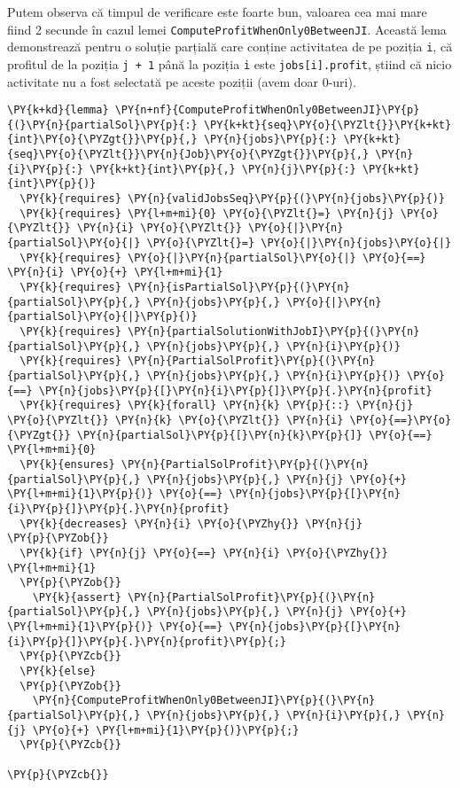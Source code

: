 Putem observa că timpul de verificare este foarte bun, valoarea cea mai mare  fiind 2 secunde în cazul lemei \texttt{ComputeProfitWhenOnly0BetweenJI}.
Această lema demonstrează pentru o soluție parțială care conține activitatea de pe poziția \texttt{i}, că profitul de la poziția \texttt{j + 1} până la poziția \texttt{i} este \texttt{jobs[i].profit}, știind că nicio activitate nu a fost selectată pe aceste poziții (avem doar 0-uri).

\begin{Verbatim}[commandchars=\\\{\}, fontsize=\footnotesize]
\PY{k+kd}{lemma} \PY{n+nf}{ComputeProfitWhenOnly0BetweenJI}\PY{p}{(}\PY{n}{partialSol}\PY{p}{:} \PY{k+kt}{seq}\PY{o}{\PYZlt{}}\PY{k+kt}{int}\PY{o}{\PYZgt{}}\PY{p}{,} \PY{n}{jobs}\PY{p}{:} \PY{k+kt}{seq}\PY{o}{\PYZlt{}}\PY{n}{Job}\PY{o}{\PYZgt{}}\PY{p}{,} \PY{n}{i}\PY{p}{:} \PY{k+kt}{int}\PY{p}{,} \PY{n}{j}\PY{p}{:} \PY{k+kt}{int}\PY{p}{)}
  \PY{k}{requires} \PY{n}{validJobsSeq}\PY{p}{(}\PY{n}{jobs}\PY{p}{)}
  \PY{k}{requires} \PY{l+m+mi}{0} \PY{o}{\PYZlt{}=} \PY{n}{j} \PY{o}{\PYZlt{}} \PY{n}{i} \PY{o}{\PYZlt{}} \PY{o}{|}\PY{n}{partialSol}\PY{o}{|} \PY{o}{\PYZlt{}=} \PY{o}{|}\PY{n}{jobs}\PY{o}{|}
  \PY{k}{requires} \PY{o}{|}\PY{n}{partialSol}\PY{o}{|} \PY{o}{==} \PY{n}{i} \PY{o}{+} \PY{l+m+mi}{1}
  \PY{k}{requires} \PY{n}{isPartialSol}\PY{p}{(}\PY{n}{partialSol}\PY{p}{,} \PY{n}{jobs}\PY{p}{,} \PY{o}{|}\PY{n}{partialSol}\PY{o}{|}\PY{p}{)}
  \PY{k}{requires} \PY{n}{partialSolutionWithJobI}\PY{p}{(}\PY{n}{partialSol}\PY{p}{,} \PY{n}{jobs}\PY{p}{,} \PY{n}{i}\PY{p}{)}
  \PY{k}{requires} \PY{n}{PartialSolProfit}\PY{p}{(}\PY{n}{partialSol}\PY{p}{,} \PY{n}{jobs}\PY{p}{,} \PY{n}{i}\PY{p}{)} \PY{o}{==} \PY{n}{jobs}\PY{p}{[}\PY{n}{i}\PY{p}{]}\PY{p}{.}\PY{n}{profit}
  \PY{k}{requires} \PY{k}{forall} \PY{n}{k} \PY{p}{::} \PY{n}{j} \PY{o}{\PYZlt{}} \PY{n}{k} \PY{o}{\PYZlt{}} \PY{n}{i} \PY{o}{==}\PY{o}{\PYZgt{}} \PY{n}{partialSol}\PY{p}{[}\PY{n}{k}\PY{p}{]} \PY{o}{==} \PY{l+m+mi}{0}
  \PY{k}{ensures} \PY{n}{PartialSolProfit}\PY{p}{(}\PY{n}{partialSol}\PY{p}{,} \PY{n}{jobs}\PY{p}{,} \PY{n}{j} \PY{o}{+} \PY{l+m+mi}{1}\PY{p}{)} \PY{o}{==} \PY{n}{jobs}\PY{p}{[}\PY{n}{i}\PY{p}{]}\PY{p}{.}\PY{n}{profit}
  \PY{k}{decreases} \PY{n}{i} \PY{o}{\PYZhy{}} \PY{n}{j}
\PY{p}{\PYZob{}}
  \PY{k}{if} \PY{n}{j} \PY{o}{==} \PY{n}{i} \PY{o}{\PYZhy{}} \PY{l+m+mi}{1}
  \PY{p}{\PYZob{}}
    \PY{k}{assert} \PY{n}{PartialSolProfit}\PY{p}{(}\PY{n}{partialSol}\PY{p}{,} \PY{n}{jobs}\PY{p}{,} \PY{n}{j} \PY{o}{+} \PY{l+m+mi}{1}\PY{p}{)} \PY{o}{==} \PY{n}{jobs}\PY{p}{[}\PY{n}{i}\PY{p}{]}\PY{p}{.}\PY{n}{profit}\PY{p}{;}
  \PY{p}{\PYZcb{}}
  \PY{k}{else}
  \PY{p}{\PYZob{}}
    \PY{n}{ComputeProfitWhenOnly0BetweenJI}\PY{p}{(}\PY{n}{partialSol}\PY{p}{,} \PY{n}{jobs}\PY{p}{,} \PY{n}{i}\PY{p}{,} \PY{n}{j} \PY{o}{+} \PY{l+m+mi}{1}\PY{p}{)}\PY{p}{;}
  \PY{p}{\PYZcb{}}

\PY{p}{\PYZcb{}}
\end{Verbatim}


